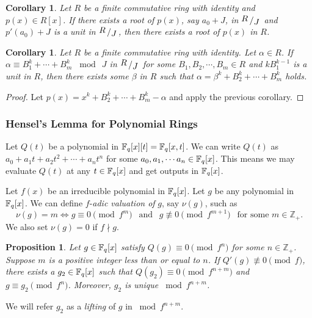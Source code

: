 \documentclass[11pt,reqno]{amsart}
\newtheorem{cor}[thm]{Corollary}
\newtheorem{prop}[thm]{Proposition}
\newcommand{\bigslant}[2]{{\raisebox{.2em}{$#1$}\left/\raisebox{-.2em}{$#2$}\right.}}
\begin{document}
\begin{cor}
Let $R$ be a finite commutative ring with identity and $p(x) \in R[x]$. If there exists a root of $p(x)$, say $a_0+J$, in $\bigslant{R}{J}$ and $p'(a_0)+J$ is a unit in $\bigslant{R}{J}$, then there exists a root of $p(x)$ in $R$. 
\end{cor}

\begin{cor}\label{Hensel2}
Let $R$ be a finite commutative ring with identity. Let $\alpha \in R$. If $\alpha \equiv B_1^k + \cdots+ B_m^k$ $\bmod \ J$ in $\bigslant{R}{J}$ for some $B_1,B_2,\cdots,B_m \in R$ and $k B_1^{k-1}$ is a unit in $R$, then there exists some $\beta$ in $R$ such that $\alpha=\beta^k +B_2^k+\cdots+ B_m^k$ holds.
\end{cor}

\begin{proof}
Let $p(x)= x^k+B_2^k + \cdots+ B_m^k-\alpha$ and apply the previous corollary.
\end{proof}

\subsubsection{Hensel's Lemma for Polynomial Rings} 

Let $Q(t)$ be a polynomial in $\Bbb F_q[x][t]=\Bbb F_q[x, t]$. We can write $Q(t)$ as $a_0+a_1t+a_2t^2+ \cdots + a_nt^n$ for some $a_0, a_1,  \cdots a_n \in \Bbb F_q[x]$. This means we may evaluate $Q(t)$ at any $t \in \Bbb F_q[x]$ and get outputs in $\Bbb F_q[x]$. 

Let $f(x)$ be an irreducible polynomial in $\Bbb F_q[x]$. Let $g$ be any polynomial in $\Bbb F_q[x]$. We can define $f$-\emph{adic valuation of} $g$, say $\nu(g)$, such as
\[ \nu (g)=m \iff g \equiv 0 \pmod{f^m} \ \  \text{ and } \ \ g \not\equiv 0 \pmod{f^{m+1}} \ \ \text{ for some } m \in \mathbb{Z}_{+}.\] 
We also set $\nu(g)=0$ if $f \nmid g$. 

\begin{prop} \label{Hensel for poly-weak version} 
Let $g \in \Bbb F_q[x]$ satisfy $Q(g) \equiv 0 \pmod{f^{n}}$ for some $n \in \mathbb{Z}_{+}$. Suppose $m$ is a positive integer less than or equal to $n$. If $Q'(g) \not\equiv 0 \pmod{f}$, there exists a $g_{2} \in \Bbb F_q[x]$ such that $Q(g_{2}) \equiv 0 \pmod{f^{n+m}}$ and $g \equiv g_{2} \pmod{f^{n}}$. Moreover, $g_{2}$ is unique $\bmod{f^{n+m}}$.
\end{prop}

We will refer $g_{2}$ as a \emph{lifting} of $g$ in $\bmod{f^{n+m}}$.
\end{document}
